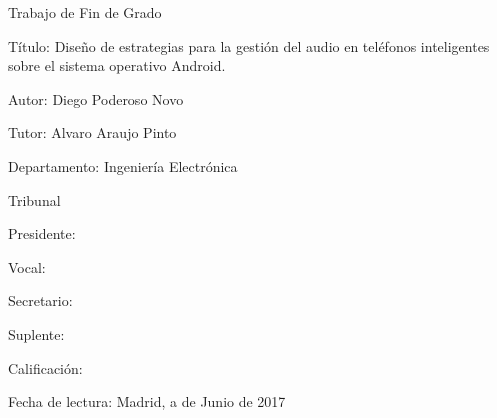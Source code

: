 \newenvironment{xdesc}[2]
  {\begin{description}[leftmargin=#2,labelindent=#1,labelwidth=#1, labelsep=0pt,align=left,style=multiline]}
  {\end{description}}

\begin{center}
	\large {\textsf{Trabajo de Fin de Grado}}
\end{center}

\bigskip

\begin{xdesc}{-1cm}{4cm}
\large{
	\item[Título:] Diseño de estrategias para la gestión del audio en teléfonos inteligentes sobre el sistema operativo Android.
	\item[Autor:] Diego Poderoso Novo
	\item[Tutor:] Alvaro Araujo Pinto
	\item[Departamento:] Ingeniería Electrónica
}
\end{xdesc}

\bigskip
\bigskip
\bigskip
\bigskip
\bigskip
\bigskip

\begin{center}
	\large{\textsf{Tribunal}}
\end{center}

\bigskip

\begin{xdesc}{-1cm}{4cm}
\large{
	\item[Presidente:] 
	\item[Vocal:] 
	\item[Secretario:] 
	\item[Suplente:]
	\item %
}
\end{xdesc}

\bigskip
\bigskip
\bigskip
\bigskip
\bigskip
\bigskip
\bigskip
\bigskip
\bigskip

\begin{flushleft}
\large{\textsf{Calificación:}}
\end{flushleft}

\bigskip
\bigskip

\begin{flushleft}
	\large{\textsf{Fecha de lectura:}}
	Madrid, a \hspace{1cm} de Junio de 2017
\end{flushleft}